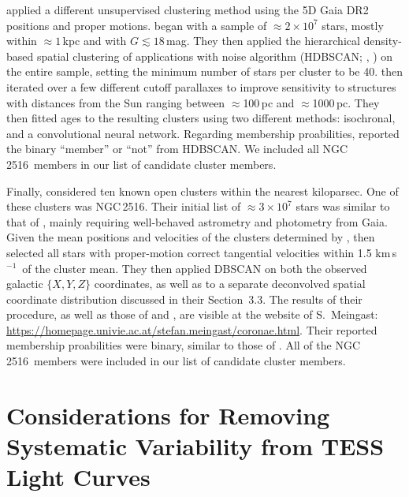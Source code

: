 \documentclass[12pt,twocolumn,tighten]{aastex63}
\newcommand{\cn}{NGC\,2516} %
\newcommand{\kms}{\,km\,s$^{-1}$}
\begin{document}
 applied a different unsupervised
clustering method using the 5D Gaia DR2 positions and proper motions.
 began with a sample of
$\approx$$2\times 10^7$ stars, mostly within $\approx 1$\,kpc and with
$G\lesssim18$\,mag.  They then applied the hierarchical density-based
spatial clustering of applications with noise algorithm (HDBSCAN;
\citealt{campello_hierarchical_2015}, \citealt{mcinnes_hdbscan_2017})
on the entire sample,  setting the minimum number of stars per cluster
to be 40.   then iterated over a
few different cutoff parallaxes to improve sensitivity to structures
with distances from the Sun ranging between $\approx$100\,pc and
$\approx$1000\,pc.  They then fitted ages to the resulting clusters
using two different methods: isochronal, and a convolutional neural
network.  Regarding membership proabilities,
 reported the binary ``member'' or
``not'' from HDBSCAN.
We included all  \cn\ members in
our list of candidate cluster members.

Finally,  considered ten known open clusters
within the nearest kiloparsec. One of these clusters was \cn.  Their
initial  list of $\approx$$3\times10^7$ stars was similar to that of
, mainly requiring well-behaved
astrometry and photometry from Gaia.  Given the mean positions and
velocities of the clusters determined by
,  then
selected all stars with proper-motion correct tangential velocities
within 1.5\,\kms\ of the cluster mean.  They then applied DBSCAN
\citep{ester_density-based_1996} on both the observed galactic
$\{X,Y,Z\}$ coordinates, as well as to a separate deconvolved spatial
coordinate distribution discussed in their Section~3.3.  The results
of their procedure, as well as those of
 and
, are visible at the website of
S.~Meingast:
\url{https://homepage.univie.ac.at/stefan.meingast/coronae.html}.
Their reported membership proabilities were binary, similar to those
of .  All of the
 \cn\ members were included in our list of
candidate cluster members.




\section{Considerations for Removing Systematic Variability from TESS Light Curves}
\label{app:detrending}
\end{document}
